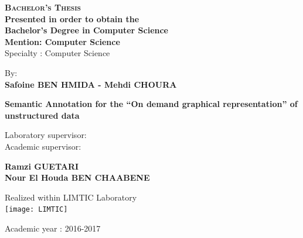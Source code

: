 \begin{center}
    
\end{center}
\begin{center}
{\large{\textbf{\textsc{Bachelor's Thesis}}}}\\
{\textbf{Presented in order to obtain the}}\\
{\textbf{Bachelor's Degree in Computer Science}}\\
{\textbf{Mention: Computer Science}}\\
{Specialty : Computer Science}
\end{center}
\vskip1cm%
\begin{center}
\textrm{By:}\\
{\large\textbf{Safoine BEN HMIDA - Mehdi CHOURA}}\\
\vskip1cm
\begin{minipage}[l]{1\columnwidth}
        \begin{tcolorbox}[colframe=blue,colback=white,boxrule=2pt,arc=10pt,height=30mm]
         \vskip1mm
            \centering
        {\LARGE\textbf{Semantic Annotation for the “On demand graphical representation” of unstructured data}} 
        \end{tcolorbox}
    \end{minipage}
\end{center}
\vskip1cm%
\begin{center}
\begin{minipage}[c]{0.11\columnwidth}
\end{minipage}
\hfill
\begin{minipage}[c]{0.29\columnwidth}
Laboratory supervisor:\\
Academic supervisor:
\end{minipage}
\hfill
\begin{minipage}[c]{0.47\columnwidth}
\textbf{Ramzi GUETARI}\\
\textbf{Nour El Houda BEN CHAABENE}
\end{minipage}
\hfill
\end{center}
\vskip1cm
\begin{center}
{Realized within LIMTIC Laboratory}\\
\vskip1cm
\texttt{[image: LIMTIC]}
\end{center}
\vskip1cm%
\begin{center}
{\textrm{Academic year : 2016-2017}}\\
\end{center}
\vfill
\newpage